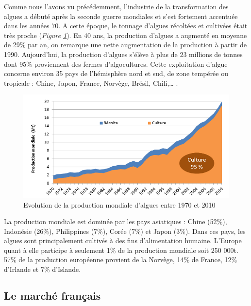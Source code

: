 \documentclass[
]{book}
\begin{document}
Comme nous l'avons vu précédemment, l'industrie de la transformation des algues a débuté après la seconde guerre mondiales et s'est fortement accentuée dans les années 70. A cette époque, le tonnage d'algues récoltées et cultivées était très proche (\emph{Figure \ref{fig:marchemondial}}). En 40 ans, la production d'algues a augmenté en moyenne de 29\% par an, on remarque une nette augmentation de la production à partir de 1990. Aujourd'hui, la production d'algues s'élève à plus de 23 millions de tonnes dont 95\% proviennent des fermes d'algocultures. Cette exploitation d'algue concerne environ 35 pays de l'hémisphère nord et sud, de zone tempérée ou tropicale : Chine, Japon, France, Norvège, Brésil, Chili,\ldots{} .

\begin{figure}

{\centering \includegraphics{images/marchemondial} 

}

\caption{Evolution de la production mondiale d’algues entre 1970 et 2010}\label{fig:marchemondial}
\end{figure}

La production mondiale est dominée par les pays asiatiques : Chine (52\%), Indonésie (26\%), Philippines (7\%), Corée (7\%) et Japon (3\%). Dans ces pays, les algues sont principalement cultivés à des fins d'alimentation humaine. L'Europe quant à elle participe à seulement 1\% de la production mondiale soit 250 000t. 57\% de la production européenne provient de la Norvège, 14\% de France, 12\% d'Irlande et 7\% d'Islande.

\hypertarget{le-marchuxe9-franuxe7ais}{%
\subsection{Le marché français}\label{le-marchuxe9-franuxe7ais}}
\end{document}

